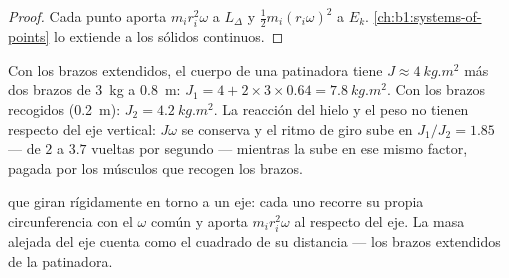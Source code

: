 \begin{proof}
Cada punto aporta $m_ir_i^2\omega$ a $L_\Delta$ y $\tfrac12 m_i(r_i\omega)^2$
a $E_k$. \cref{ch:b1:systems-of-points} lo extiende a los sólidos continuos.
\end{proof}

\begin{example}[La patinadora]\label{ex:b1:angular-momentum:skater}
Con los brazos extendidos, el cuerpo de una patinadora tiene
$J \approx \qty{4}{kg.m^2}$ más dos brazos de \qty{3}{kg} a \qty{0.8}{m}: $J_1 = 4 + 2 \times 3 \times 0.64 =
\qty{7.8}{kg.m^2}$. Con los brazos recogidos (\qty{0.2}{m}):
$J_2 = \qty{4.2}{kg.m^2}$. La reacción del hielo y el peso no tienen
 respecto del eje vertical: $J\omega$ se conserva y el ritmo de giro
sube en $J_1/J_2 = 1.85$ --- de $2$ a $3.7$ vueltas por segundo ---
mientras la  sube en ese mismo factor, pagada por los
músculos que recogen los brazos.
\end{example}

\begin{omfigure}

{\small {} que giran rígidamente en torno a un eje: cada
uno recorre su propia circunferencia con el $\omega$ común y aporta
$m_ir_i^2\omega$ al  respecto del eje. La masa alejada del
eje cuenta como el cuadrado de su distancia --- los brazos extendidos de
la patinadora.}
\end{omfigure}

